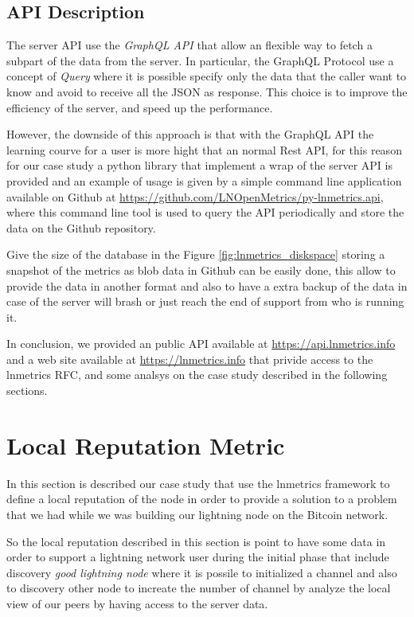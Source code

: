 \subsection{API Description}

The server API use the \emph{GraphQL API} that allow an flexible way to fetch
a subpart of the data from the server. In particular, the GraphQL Protocol use
a concept of \emph{Query} where it is possible specify only the data that the 
caller want to know and avoid to receive all the JSON as response. This choice is to
improve the efficiency of the server, and speed up the performance. 

However, the downside of this approach is that with the GraphQL API the learning 
courve for a user is more hight that an normal Rest API, for this reason for our
case study a python library that implement a wrap of the server API is provided 
and an example of usage is given by a simple command line application 
available on Github at \url{https://github.com/LNOpenMetrics/py-lnmetrics.api}, 
where this command line tool is used to query the API periodically 
and store the data on the Github repository. 

Give the size of the database in the Figure \ref{fig:lnmetrics_diskspace}
storing a snapshot of the metrics as blob data in Github can be easily done, this allow 
to provide the data in another format and also to have a extra backup of the data 
in case of the server will brash or just reach the end of support from who is running it.

In conclusion, we provided an public API available at \url{https://api.lnmetrics.info} and 
a web site available at \url{https://lnmetrics.info} that privide access to the 
lnmetrics RFC, and some analsys on the case study described in the 
following sections.

\section{Local Reputation Metric}
\label{sec:demo}

In this section is described our case study that use the lnmetrics framework to 
define a local reputation of the node in order to provide a solution to a problem 
that we had while we was building our lightning node on the Bitcoin network.

So the local reputation described in this section is point to have some data 
in order to support a lightning network user during the initial phase that include 
discovery \emph{good lightning node} where it is possile to initialized a channel 
and also to discovery other node to increate the number of channel by analyze
the local view of our peers by having access to the server data.

